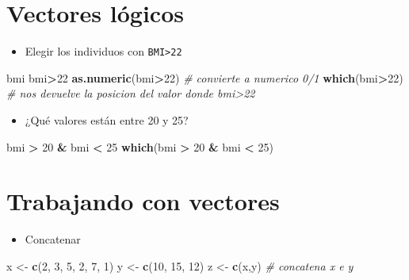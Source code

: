 \documentclass[]{book}
\newenvironment{Shaded}{\begin{snugshade}}{\end{snugshade}}
\newcommand{\KeywordTok}[1]{\textcolor[rgb]{0.13,0.29,0.53}{\textbf{#1}}}
\newcommand{\DecValTok}[1]{\textcolor[rgb]{0.00,0.00,0.81}{#1}}
\newcommand{\StringTok}[1]{\textcolor[rgb]{0.31,0.60,0.02}{#1}}
\newcommand{\CommentTok}[1]{\textcolor[rgb]{0.56,0.35,0.01}{\textit{#1}}}
\newcommand{\OperatorTok}[1]{\textcolor[rgb]{0.81,0.36,0.00}{\textbf{#1}}}
\newcommand{\NormalTok}[1]{#1}
\providecommand{\tightlist}{%
  \setlength{\itemsep}{0pt}\setlength{\parskip}{0pt}}
\begin{document}
\section{Vectores lógicos}\label{vectores-luxf3gicos}

\begin{itemize}
\tightlist
\item
  Elegir los individuos con \texttt{BMI\textgreater{}22}
\end{itemize}

\begin{Shaded}
\begin{Highlighting}[]
\NormalTok{bmi}
\NormalTok{bmi}\OperatorTok{>}\DecValTok{22}
\KeywordTok{as.numeric}\NormalTok{(bmi}\OperatorTok{>}\DecValTok{22}\NormalTok{) }\CommentTok{# convierte a numerico 0/1}
\KeywordTok{which}\NormalTok{(bmi}\OperatorTok{>}\DecValTok{22}\NormalTok{)  }\CommentTok{# nos devuelve la posicion del valor donde bmi>22}
\end{Highlighting}
\end{Shaded}

\begin{itemize}
\tightlist
\item
  ¿Qué valores están entre 20 y 25?
\end{itemize}

\begin{Shaded}
\begin{Highlighting}[]
\NormalTok{bmi }\OperatorTok{>}\StringTok{ }\DecValTok{20} \OperatorTok{&}\StringTok{ }\NormalTok{bmi }\OperatorTok{<}\StringTok{ }\DecValTok{25}
\KeywordTok{which}\NormalTok{(bmi }\OperatorTok{>}\StringTok{ }\DecValTok{20} \OperatorTok{&}\StringTok{ }\NormalTok{bmi }\OperatorTok{<}\StringTok{ }\DecValTok{25}\NormalTok{)}
\end{Highlighting}
\end{Shaded}

\section{Trabajando con vectores}\label{trabajando-con-vectores}

\begin{itemize}
\tightlist
\item
  Concatenar
\end{itemize}

\begin{Shaded}
\begin{Highlighting}[]
\NormalTok{x <-}\StringTok{ }\KeywordTok{c}\NormalTok{(}\DecValTok{2}\NormalTok{, }\DecValTok{3}\NormalTok{, }\DecValTok{5}\NormalTok{, }\DecValTok{2}\NormalTok{, }\DecValTok{7}\NormalTok{, }\DecValTok{1}\NormalTok{)}
\NormalTok{y <-}\StringTok{ }\KeywordTok{c}\NormalTok{(}\DecValTok{10}\NormalTok{, }\DecValTok{15}\NormalTok{, }\DecValTok{12}\NormalTok{)}
\NormalTok{z <-}\StringTok{ }\KeywordTok{c}\NormalTok{(x,y)  }\CommentTok{# concatena x e y}
\end{Highlighting}
\end{Shaded}
\end{document}
